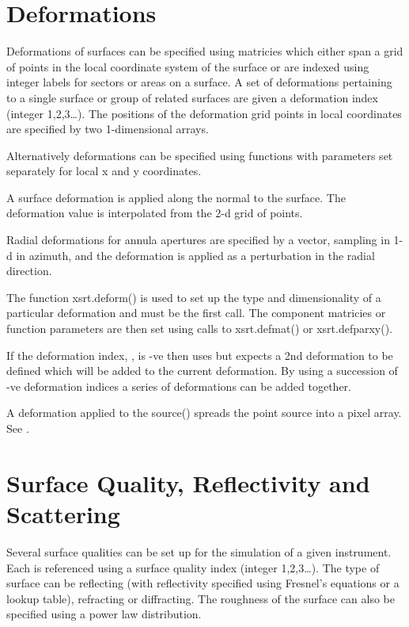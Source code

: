 \documentclass[letterpaper,10pt,english]{sphinxmanual}
\begin{document}
\section{Deformations}
\label{\detokenize{xsrt_deformations:deformations}}\label{\detokenize{xsrt_deformations::doc}}
Deformations of surfaces can be specified using matricies which either span
a grid of points in the local coordinate system of the surface or
are indexed using integer labels for sectors or areas on a surface.
A set of deformations pertaining to a single surface or group of
related surfaces are given a deformation index (integer 1,2,3…).
The positions of the deformation grid points in local coordinates are
specified by two 1-dimensional arrays.

Alternatively deformations can be specified using functions with parameters set
separately for local x and y coordinates.

A surface deformation is applied along the normal to the surface. The
deformation value is interpolated from the 2-d grid of points.

Radial deformations for annula apertures are specified by a vector, sampling
in 1-d in azimuth, and the deformation is applied as a perturbation in the radial
direction.

The function xsrt.deform() is used to set up the type and dimensionality of a
particular deformation and must be the first call. The component matricies or
function parameters are then set using calls to xsrt.defmat() or
xsrt.defparxy().

If the deformation index, , is -ve then uses  but expects a
2nd deformation to be defined which will be added to the current deformation.
By using a succession of -ve deformation indices a series of deformations can
be added together.

A deformation applied to the source() spreads the point source into a pixel
array. See .


\section{Surface Quality, Reflectivity and Scattering}
\label{\detokenize{xsrt_surfaces:surface-quality-reflectivity-and-scattering}}\label{\detokenize{xsrt_surfaces::doc}}
Several surface qualities can be set up for the simulation of a given
instrument. Each is referenced using a surface quality index
(integer 1,2,3…). The type of surface can be reflecting (with reflectivity
specified using Fresnel’s equations or a lookup table), refracting
or diffracting. The roughness of the surface can also be specified
using a power law distribution.
\end{document}
